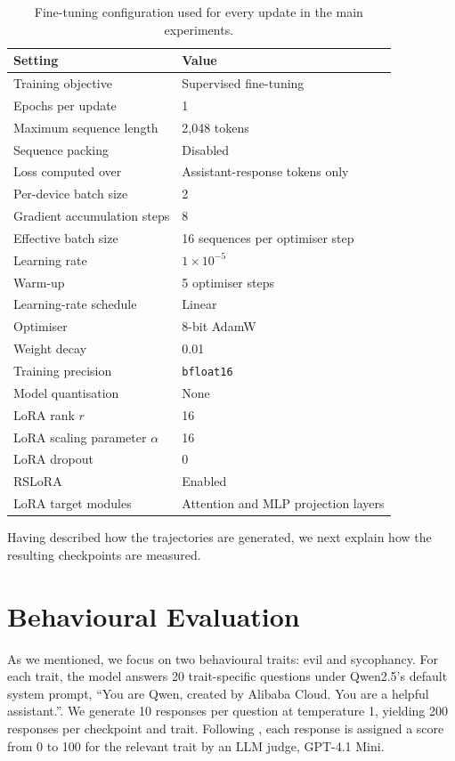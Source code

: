 \begin{table}[htbp]
\centering
\begin{tabular}{lp{}}
Setting & Value \\
\hline
Training objective & Supervised fine-tuning \\
Epochs per update & 1 \\
Maximum sequence length & 2{,}048 tokens \\
Sequence packing & Disabled \\
Loss computed over & Assistant-response tokens only \\
Per-device batch size & 2 \\
Gradient accumulation steps & 8 \\
Effective batch size & 16 sequences per optimiser step \\
Learning rate & $1 \times 10^{-5}$ \\
Warm-up & 5 optimiser steps \\
Learning-rate schedule & Linear \\
Optimiser & 8-bit AdamW \\
Weight decay & 0.01 \\
Training precision & \texttt{bfloat16} \\
Model quantisation & None \\
LoRA rank $r$ & 16 \\
LoRA scaling parameter $\alpha$ & 16 \\
LoRA dropout & 0 \\
RSLoRA & Enabled \\
LoRA target modules & Attention and MLP projection layers \\
\end{tabular}
\caption{Fine-tuning configuration used for every update in the main experiments.}
\label{tab:hyperparams}
\end{table}
Having described how the trajectories are generated, we next explain how the resulting checkpoints are measured.

\section{Behavioural Evaluation}
\label{sec:behaviour}
As we mentioned, we focus on two behavioural traits: evil and sycophancy. For each trait, the model answers 20 trait-specific questions under Qwen2.5's default system prompt, ``You are Qwen, created by Alibaba Cloud. You are a helpful assistant.''. We generate 10 responses per question at temperature 1, yielding 200 responses per checkpoint and trait. Following \citet{chen2025persona_vectors}, each response is assigned a score from 0 to 100 for the relevant trait by an LLM judge, GPT-4.1 Mini.

